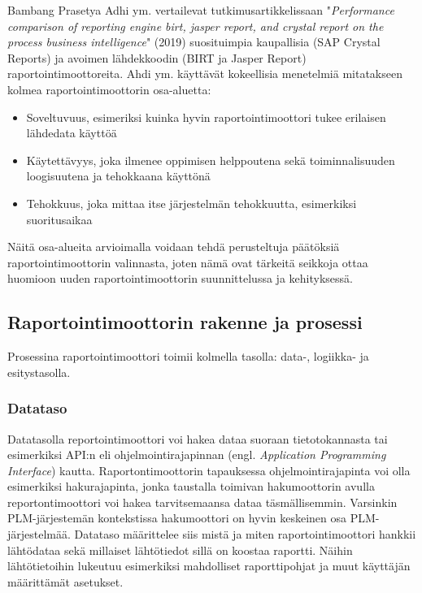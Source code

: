 Bambang Prasetya Adhi ym. vertailevat tutkimusartikkelissaan "\textit{Performance comparison of reporting engine birt, jasper report, and crystal report on the process business intelligence}" (2019) \cite{adhi_performance_2019} suosituimpia kaupallisia (SAP Crystal Reports) ja avoimen lähdekkoodin (BIRT ja Jasper Report) raportointimoottoreita. Ahdi ym. käyttävät kokeellisia menetelmiä mitatakseen kolmea raportointimoottorin osa-aluetta:
\begin{itemize}
	\item Soveltuvuus, esimeriksi kuinka hyvin raportointimoottori tukee erilaisen lähdedata käyttöä
	\item Käytettävyys, joka ilmenee oppimisen helppoutena sekä toiminnalisuuden loogisuutena ja tehokkaana käyttönä
	\item Tehokkuus, joka mittaa itse järjestelmän tehokkuutta, esimerkiksi suoritusaikaa
\end{itemize}
Näitä osa-alueita arvioimalla voidaan tehdä perusteltuja päätöksiä raportointimoottorin valinnasta, joten nämä ovat tärkeitä seikkoja ottaa huomioon uuden raportointimoottorin suunnittelussa ja kehityksessä.

\subsection{Raportointimoottorin rakenne ja prosessi} \label{Raportointimoottorin rakenne ja prosessi}

Prosessina raportointimoottori toimii kolmella tasolla: data-, logiikka- ja esitystasolla.\cite{he_design_2010}

\subsubsection{Datataso}

Datatasolla reportointimoottori voi hakea dataa suoraan tietotokannasta tai esimerkiksi API:n eli ohjelmointirajapinnan (engl. \textit{Application Programming Interface}) kautta. Raportontimoottorin tapauksessa ohjelmointirajapinta voi olla esimerkiksi hakurajapinta, jonka taustalla toimivan hakumoottorin avulla reportontimoottori voi hakea tarvitsemaansa dataa täsmällisemmin. Varsinkin PLM-järjestemän kontekstissa hakumoottori on hyvin keskeinen osa PLM-järjestelmää. Datataso määrittelee siis mistä ja miten raportointimoottori hankkii lähtödataa sekä millaiset lähtötiedot sillä on koostaa raportti. Näihin lähtötietoihin lukeutuu esimerkiksi mahdolliset raporttipohjat ja muut käyttäjän määrittämät asetukset.

